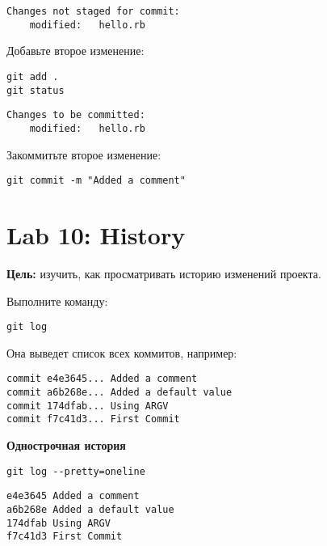 \documentclass[a4paper,12pt]{report}
\begin{document}
\begin{verbatim}
Changes not staged for commit:
	modified:   hello.rb
\end{verbatim}

Добавьте второе изменение:
\begin{verbatim}
git add .
git status
\end{verbatim}

\begin{verbatim}
Changes to be committed:
	modified:   hello.rb
\end{verbatim}

Закоммитьте второе изменение:
\begin{verbatim}
git commit -m "Added a comment"
\end{verbatim}


\section{Lab 10: History}
\textbf{Цель:} изучить, как просматривать историю изменений проекта.

Выполните команду:
\begin{verbatim}
git log
\end{verbatim}

Она выведет список всех коммитов, например:
\begin{verbatim}
commit e4e3645... Added a comment
commit a6b268e... Added a default value
commit 174dfab... Using ARGV
commit f7c41d3... First Commit
\end{verbatim}


\textbf{Однострочная история}
\begin{verbatim}
git log --pretty=oneline
\end{verbatim}

\begin{verbatim}
e4e3645 Added a comment
a6b268e Added a default value
174dfab Using ARGV
f7c41d3 First Commit
\end{verbatim}

\end{document}
